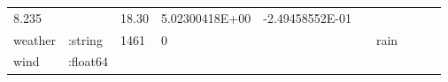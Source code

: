 \documentclass[]{article}
\begin{document}
\begin{longtable}[]{@{}llllllllll@{}}
\begin{minipage}[t]{0.06\columnwidth}
8.235\strut
\end{minipage} & \begin{minipage}[t]{0.04\columnwidth}\raggedright
\strut
\end{minipage} & \begin{minipage}[t]{0.06\columnwidth}\raggedright
18.30\strut
\end{minipage} & \begin{minipage}[t]{0.11\columnwidth}\raggedright
5.02300418E+00\strut
\end{minipage} & \begin{minipage}[t]{0.09\columnwidth}\raggedright
-2.49458552E-01\strut
\end{minipage}\tabularnewline
\begin{minipage}[t]{0.08\columnwidth}\raggedright
weather\strut
\end{minipage} & \begin{minipage}[t]{0.11\columnwidth}\raggedright
:string\strut
\end{minipage} & \begin{minipage}[t]{0.05\columnwidth}\raggedright
1461\strut
\end{minipage} & \begin{minipage}[t]{0.06\columnwidth}\raggedright
0\strut
\end{minipage} & \begin{minipage}[t]{0.06\columnwidth}\raggedright
\strut
\end{minipage} & \begin{minipage}[t]{0.06\columnwidth}\raggedright
\strut
\end{minipage} & \begin{minipage}[t]{0.04\columnwidth}\raggedright
rain\strut
\end{minipage} & \begin{minipage}[t]{0.06\columnwidth}\raggedright
\strut
\end{minipage} & \begin{minipage}[t]{0.11\columnwidth}\raggedright
\strut
\end{minipage} & \begin{minipage}[t]{0.09\columnwidth}\raggedright
\strut
\end{minipage}\tabularnewline
\begin{minipage}[t]{0.08\columnwidth}\raggedright
wind\strut
\end{minipage} & \begin{minipage}[t]{0.11\columnwidth}\raggedright
:float64\strut
\end{minipage} & \begin{minipage}[t]{0.05\columnwidth}\raggedright

\end{minipage}
\end{longtable}
\end{document}
